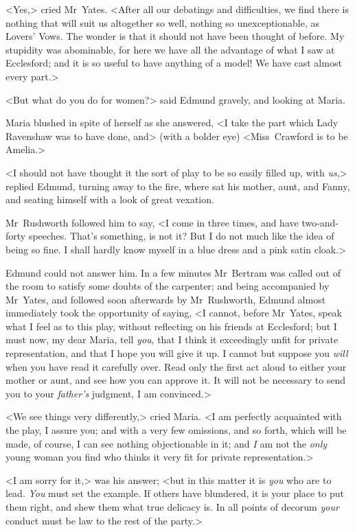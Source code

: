 <Yes,> cried Mr~Yates. <After all our debatings and difficulties, we find there is nothing that will suit us altogether so well, nothing so unexceptionable, as Lovers' Vows. The wonder is that it should not have been thought of before. My stupidity was abominable, for here we have all the advantage of what I saw at Ecclesford; and it is so useful to have anything of a model! We have cast almost every part.>

<But what do you do for women?> said Edmund gravely, and looking at Maria.

Maria blushed in spite of herself as she answered, <I take the part which Lady Ravenshaw was to have done, and> (with a bolder eye) <Miss~Crawford is to be Amelia.>

<I should not have thought it the sort of play to be so easily filled up, with \textit{us},> replied Edmund, turning away to the fire, where sat his mother, aunt, and Fanny, and seating himself with a look of great vexation.

Mr~Rushworth followed him to say, <I come in three times, and have two-and-forty speeches. That's something, is not it? But I do not much like the idea of being so fine. I shall hardly know myself in a blue dress and a pink satin cloak.>

Edmund could not answer him. In a few minutes Mr~Bertram was called out of the room to satisfy some doubts of the carpenter; and being accompanied by Mr~Yates, and followed soon afterwards by Mr~Rushworth, Edmund almost immediately took the opportunity of saying, <I cannot, before Mr~Yates, speak what I feel as to this play, without reflecting on his friends at Ecclesford; but I must now, my dear Maria, tell \textit{you}, that I think it exceedingly unfit for private representation, and that I hope you will give it up. I cannot but suppose you \textit{will}  when you have read it carefully over. Read only the first act aloud to either your mother or aunt, and see how you can approve it. It will not be necessary to send you to your \textit{father's}  judgment, I am convinced.>

<We see things very differently,> cried Maria. <I am perfectly acquainted with the play, I assure you; and with a very few omissions, and so forth, which will be made, of course, I can see nothing objectionable in it; and \textit{I}  am not the \textit{only}  young woman you find who thinks it very fit for private representation.>

<I am sorry for it,> was his answer; <but in this matter it is \textit{you}  who are to lead. \textit{You}  must set the example. If others have blundered, it is your place to put them right, and shew them what true delicacy is. In all points of decorum \textit{your}  conduct must be law to the rest of the party.>

